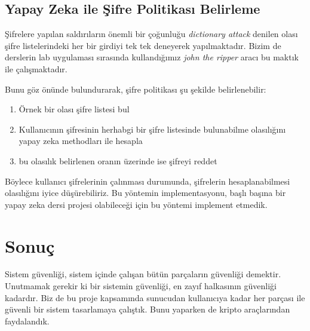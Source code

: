\documentclass[11pt,a4paper]{report}
\begin{document}
\section{Yapay Zeka ile Şifre Politikası Belirleme}
Şifrelere yapılan saldırıların önemli bir çoğunluğu \emph{dictionary attack} denilen olası şifre listelerindeki her bir girdiyi tek tek deneyerek yapılmaktadır. Bizim de derslerin lab uygulaması sırasında kullandığımız \emph{john the ripper} aracı bu maktık ile çalışmaktadır.

Bunu göz önünde bulundurarak, şifre politikası şu şekilde belirlenebilir:
\begin{enumerate}
\item Örnek bir olası şifre listesi bul
\item Kullanıcının şifresinin herhabgi bir şifre listesinde bulunabilme olasılığını yapay zeka methodları ile hesapla
\item bu olasılık belirlenen oranın üzerinde ise şifreyi reddet
\end{enumerate}

Böylece kullanıcı şifrelerinin çalınması durumunda, şifrelerin hesaplanabilmesi olasılığını iyice düşürebiliriz. Bu yöntemin implementasyonu, başlı başına bir yapay zeka dersi projesi olabileceği için bu yöntemi implement etmedik.

\chapter{Sonuç}
Sistem güvenliği, sistem içinde çalışan bütün parçaların güvenliği demektir. Unutmamak gerekir ki bir sistemin güvenliği, en zayıf halkasının güvenliği kadardır. Biz de bu proje kapsamında sunucudan kullanıcıya kadar her parçası ile güvenli bir sistem tasarlamaya çalıştık. Bunu yaparken de kripto araçlarından faydalandık.
\end{document}
